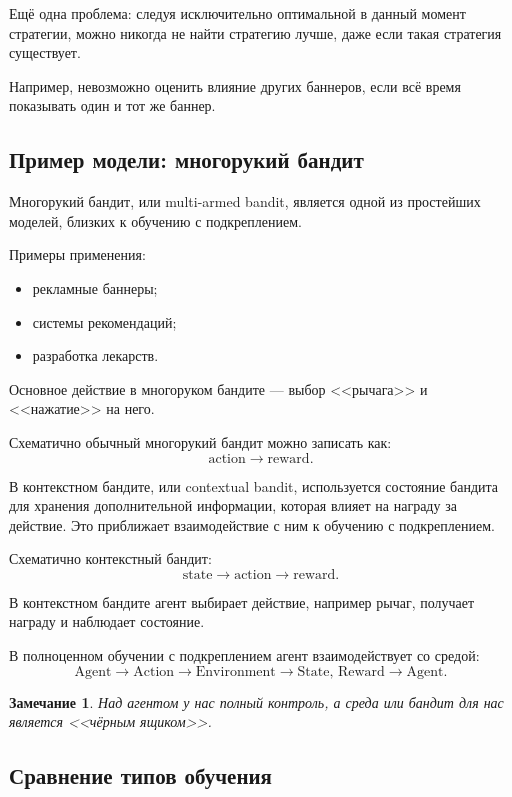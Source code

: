 \documentclass[12pt,a4paper]{article}
\newtheorem{remark}{Замечание}
\begin{document}
Ещё одна проблема: следуя исключительно оптимальной в данный момент стратегии, можно никогда не найти стратегию лучше, даже если такая стратегия существует.

Например, невозможно оценить влияние других баннеров, если всё время показывать один и тот же баннер.

\subsection{Пример модели: многорукий бандит}

Многорукий бандит, или multi-armed bandit, является одной из простейших моделей, близких к обучению с подкреплением.

Примеры применения:
\begin{itemize}
    \item рекламные баннеры;
    \item системы рекомендаций;
    \item разработка лекарств.
\end{itemize}

Основное действие в многоруком бандите --- выбор <<рычага>> и <<нажатие>> на него.

Схематично обычный многорукий бандит можно записать как:
\[
\text{action} \longrightarrow \text{reward}.
\]

В контекстном бандите, или contextual bandit, используется состояние бандита для хранения дополнительной информации, которая влияет на награду за действие. Это приближает взаимодействие с ним к обучению с подкреплением.

Схематично контекстный бандит:
\[
\text{state} \longrightarrow \text{action} \longrightarrow \text{reward}.
\]

В контекстном бандите агент выбирает действие, например рычаг, получает награду и наблюдает состояние.

В полноценном обучении с подкреплением агент взаимодействует со средой:
\[
\text{Agent}
\longrightarrow
\text{Action}
\longrightarrow
\text{Environment}
\longrightarrow
\text{State, Reward}
\longrightarrow
\text{Agent}.
\]

\begin{remark}
Над агентом у нас полный контроль, а среда или бандит для нас является <<чёрным ящиком>>.
\end{remark}

\subsection{Сравнение типов обучения}
\end{document}
